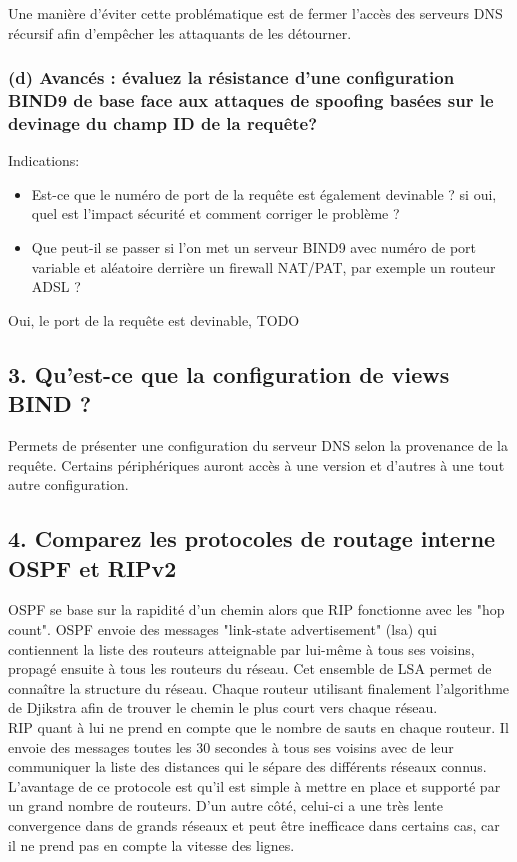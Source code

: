 \documentclass{article}
\begin{document}
Une manière d'éviter cette problématique est de fermer l'accès des serveurs DNS récursif afin d'empêcher les attaquants de les détourner.\\

\subsubsection*{(d) Avancés : évaluez la résistance d’une configuration BIND9 de base face aux attaques de spoofing basées sur le devinage du champ ID de la requête?}
Indications:
\begin{itemize}
\item Est-ce que le numéro de port de la requête est également devinable ? si oui, quel est l’impact sécurité et comment corriger le problème ?
\item Que peut-il se passer si l’on met un serveur BIND9 avec numéro de port variable et aléatoire derrière un firewall NAT/PAT, par exemple un routeur ADSL ?
\end{itemize}

Oui, le port de la requête est devinable, 
TODO\\

\subsection*{3. Qu’est-ce que la configuration de views BIND ?}
Permets de présenter une configuration du serveur DNS selon la provenance de la requête. Certains périphériques auront accès à une version et d'autres à une tout autre configuration.\cite{views}\\

\subsection*{4. Comparez les protocoles de routage interne OSPF et RIPv2}
OSPF\cite{OSPF} se base sur la rapidité d'un chemin alors que RIP\cite{RIP} fonctionne avec les "hop count". OSPF envoie des messages "link-state advertisement" (lsa) qui contiennent la liste des routeurs atteignable par lui-même à tous ses voisins, propagé ensuite à tous les routeurs du réseau. Cet ensemble de LSA permet de connaître la structure du réseau. Chaque routeur utilisant finalement l'algorithme de Djikstra afin de trouver le chemin le plus court vers chaque réseau.\\

RIP quant à lui ne prend en compte que le nombre de sauts en chaque routeur. Il envoie des messages toutes les 30 secondes à tous ses voisins avec de leur communiquer la liste des distances qui le sépare des différents réseaux connus. L'avantage de ce protocole est qu'il est simple à mettre en place et supporté par un grand nombre de routeurs. D'un autre côté, celui-ci a une très lente convergence dans de grands réseaux et peut être inefficace dans certains cas, car il ne prend pas en compte la vitesse des lignes.\cite{RIP-VS-OSPF}\\
\end{document}
